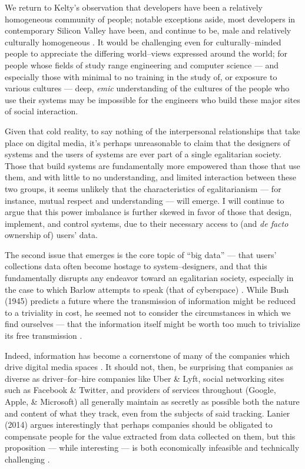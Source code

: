 \documentclass[11pt,titlepage]{article}
\begin{document}
We return to Kelty's observation that developers have been a relatively homogeneous community of people;
notable exceptions aside, most developers in contemporary Silicon Valley have been,
and continue to be, male and relatively culturally homogeneous
\cite{ullman2012close,kelty2008two}.
It would be challenging even for culturally--minded people to appreciate the differing world--views
expressed around the world; for people whose fields of study range engineering and computer science
--- and especially those with minimal to no training in the study of, or exposure to various cultures ---
deep,
\textit{emic} understanding of the cultures of the people who use their systems
may be impossible for the engineers who build these major sites of social interaction.

Given that cold reality,
to say nothing of the interpersonal relationships that take place on digital media,
it's perhaps unreasonable to claim that the designers of systems and the users of systems are ever
part of a single egalitarian society.
Those that build systems are fundamentally more empowered than those that use them,
and with little to no understanding, and limited interaction between these two groups,
it seems unlikely that the characteristics of egalitarianism
--- for instance, mutual respect and understanding ---
will emerge.
I will continue to argue that this power imbalance is further skewed
in favor of those that design, implement, and control systems,
due to their necessary access to (and \textit{de facto} ownership of) users' data.

The second issue that emerges is the core topic of ``big data''
--- that users' collections data often become hostage to system--designers,
and that this fundamentally disrupts any endeavor toward an egalitarian society,
especially in the case to which Barlow attempts to speak (that of cyberspace)
\cite{barlow2009declaration}.
While Bush (1945) predicts a future where
the transmission of information might be reduced to a triviality in cost,
he seemed not to consider the circumstances in which we find ourselves ---
that the information itself might be worth too much to trivialize its free transmission
\cite{bush1979we}.

Indeed,
information has become a cornerstone of many of the companies which drive digital media spaces
\cite{sennett2007culture,mayer2013big}.
It should not, then, be surprising that companies as diverse as
driver--for--hire companies like Uber \& Lyft,
social networking sites such as Facebook \& Twitter,
and providers of services throughout (Google, Apple, \& Microsoft)
all generally maintain as secretly as possible both
the nature and content of what they track, even from the subjects of said tracking.
Lanier (2014) argues interestingly that perhaps
companies should be obligated to compensate people for the value extracted from data collected on them,
but this proposition
--- while interesting ---
is both economically infeasible and technically challenging
\cite{lanier2014owns}.
\end{document}

